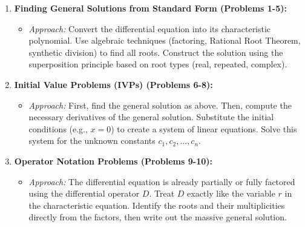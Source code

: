 \documentclass[11pt, a4paper]{article}
\theoremstyle{definition}
\theoremstyle{remark}
\begin{document}
\begin{enumerate}
    \item \textbf{Finding General Solutions from Standard Form (Problems 1-5):}
    \begin{itemize}
        \item \textit{Approach:} Convert the differential equation into its characteristic polynomial. Use algebraic techniques (factoring, Rational Root Theorem, synthetic division) to find all roots. Construct the solution using the superposition principle based on root types (real, repeated, complex).
    \end{itemize}
    \item \textbf{Initial Value Problems (IVPs) (Problems 6-8):}
    \begin{itemize}
        \item \textit{Approach:} First, find the general solution as above. Then, compute the necessary derivatives of the general solution. Substitute the initial conditions (e.g., $x=0$) to create a system of linear equations. Solve this system for the unknown constants $c_1, c_2, \dots, c_n$.
    \end{itemize}
    \item \textbf{Operator Notation Problems (Problems 9-10):}
    \begin{itemize}
        \item \textit{Approach:} The differential equation is already partially or fully factored using the differential operator $D$. Treat $D$ exactly like the variable $r$ in the characteristic equation. Identify the roots and their multiplicities directly from the factors, then write out the massive general solution.
    \end{itemize}
\end{enumerate}
\end{document}
